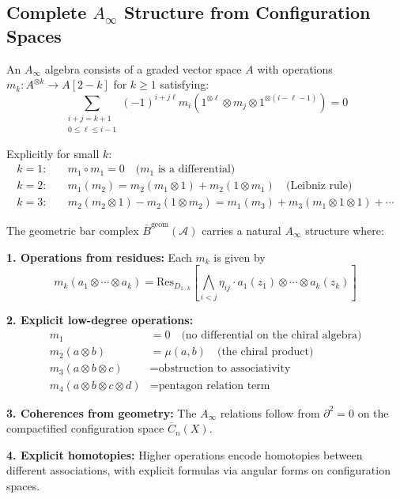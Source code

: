 \subsection{Complete $A_\infty$ Structure from Configuration Spaces}

\begin{definition}\label{def:a-infinity-complete}
An $A_\infty$ algebra consists of a graded vector space $A$ with operations $m_k: A^{\otimes k} \to A[2-k]$ for $k \geq 1$ satisfying:
$$\sum_{\substack{i+j=k+1 \\ 0 \leq \ell \leq i-1}} (-1)^{i+j\ell} m_i(1^{\otimes \ell} \otimes m_j \otimes 1^{\otimes(i-\ell-1)}) = 0$$

Explicitly for small $k$:
\begin{align}
k=1: &\quad m_1 \circ m_1 = 0 \quad \text{($m_1$ is a differential)} \\
k=2: &\quad m_1(m_2) = m_2(m_1 \otimes 1) + m_2(1 \otimes m_1) \quad \text{(Leibniz rule)} \\
k=3: &\quad m_2(m_2 \otimes 1) - m_2(1 \otimes m_2) = m_1(m_3) + m_3(m_1 \otimes 1 \otimes 1) + \cdots
\end{align}
\end{definition}

\begin{theorem}\label{thm:bar-ainfty-complete}
The geometric bar complex $\bar{B}^{\text{geom}}(\mathcal{A})$ carries a natural $A_\infty$ structure where:

\textbf{1. Operations from residues:} Each $m_k$ is given by
$$m_k(a_1 \otimes \cdots \otimes a_k) = \text{Res}_{D_{1\cdots k}}\left[\bigwedge_{i<j} \eta_{ij} \cdot a_1(z_1) \otimes \cdots \otimes a_k(z_k)\right]$$

\textbf{2. Explicit low-degree operations:}
\begin{align}
m_1 &= 0 \quad \text{(no differential on the chiral algebra)} \\
m_2(a \otimes b) &= \mu(a,b) \quad \text{(the chiral product)} \\
m_3(a \otimes b \otimes c) &= \text{obstruction to associativity} \\
m_4(a \otimes b \otimes c \otimes d) &= \text{pentagon relation term}
\end{align}

\textbf{3. Coherences from geometry:} The $A_\infty$ relations follow from $\partial^2 = 0$ on the compactified configuration space $\overline{C}_n(X)$.

\textbf{4. Explicit homotopies:} Higher operations encode homotopies between different associations, with explicit formulas via angular forms on configuration spaces.
\end{theorem}


